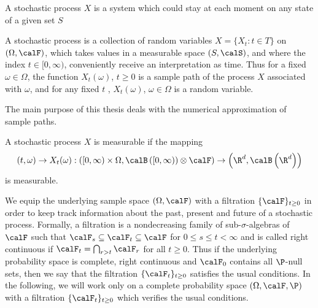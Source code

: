 
	A stochastic process $X$ is a system which could stay at each moment on any state of a given set $S$
\begin{definition}
	A stochastic process is a collection of random variables $X=\{X_t: t \in T\}$ on $(\Omega,
	\calF)$,  which takes values in a measurable space $(S,\calS)$, and where the index $t\in [0,\infty)$, 
	conveniently receive an interpretation as time. Thus for a fixed $\omega \in \Omega$, the function
	$X_t(\omega)$, $t\geq 0$ is a sample path of the process $X$ associated with $\omega$,  and for any
	fixed $t$ , $X_t(\omega)$, $\omega \in \Omega$ is a random variable. 

\end{definition}
 The main purpose of this thesis deals with the numerical approximation of sample paths.
\begin{definition}
	A stochastic process $X$ is measurable if the mapping
	\begin{equation*}
		(t, \omega) \to X_t(\omega):
		\left(
			[0,\infty)\times \Omega,
			\calB \left(
				[0,\infty)
			\right) \otimes \calF
		\right)
		\to 
		\left(
			\R^d, \calB \left (\R^d \right)
		\right)
	\end{equation*}
	is measurable.
\end{definition}
%
	We equip the underlying sample space $(\Omega, \calF)$ with a filtration $\{\calF\}_{t\geq 0}$ in order to 
keep track information about the past, present and future of a stochastic process. Formally, a filtration is
a nondecreasing family of sub-$\sigma$-algebras of $\calF$ such that 
$\calF_s\subseteq \calF_t \subseteq \calF$ for $0\leq s \leq t <\infty$ and is called right continuous if
$ %
	\calF_t = \bigcap_{r>t} \calF_r
$
for all $t\geq 0$. Thus if the underlying probability space is complete,
right continuous and $\calF_0$ contains all $\P$-null sets, then we say that the filtration
$\{ \calF_t\}_{t\geq 0}$ satisfies the usual conditions. In the following, we will work only on a
complete probability space $(\Omega, \calF, \P)$  with a filtration $\{\calF_t \}_{t \geq 0}$ which verifies
the usual conditions.
	
